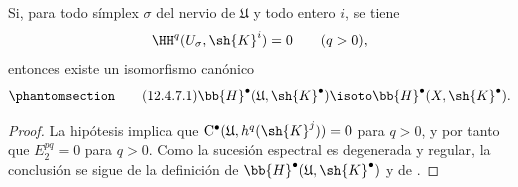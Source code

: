 \documentclass[oneside]{amsart}
\let\EGAOriginalLabel\label
\renewcommand{\label}[1]{\phantomsection\EGAOriginalLabel{#1}}
\begin{document}
\begin{corollary}[12.4.7]
\label{0.12.4.7}
Si, para todo símplex $\sigma$ del nervio de $\mathfrak{U}$ y
todo entero $i$, se tiene
\[
  \HH^q(U_\sigma,\sh{K}^i)=0
  \qquad(q>0),
\]
entonces existe un isomorfismo canónico
\begin{equation}
\label{0.12.4.7.1}
\tag{12.4.7.1}
  \bb{H}^\bullet(\mathfrak{U},\sh{K}^\bullet)
  \isoto
  \bb{H}^\bullet(X,\sh{K}^\bullet).
\end{equation}
\end{corollary}

\begin{proof}
La hipótesis implica que
$\mathrm{C}^\bullet
(\mathfrak{U},h^q(\sh{K}^j))=0$ para $q>0$, y por tanto que
$E_2^{pq}=0$ para $q>0$.
Como la sucesión espectral  es degenerada y
regular, la conclusión se sigue de la definición
 de
$\bb{H}^\bullet(\mathfrak{U},\sh{K}^\bullet)$ y de
.
\end{proof}
\end{document}
